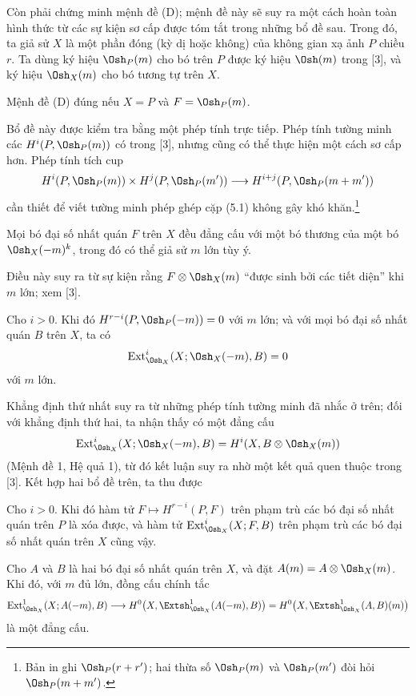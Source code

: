 Còn phải chứng minh mệnh đề (D); mệnh đề này sẽ suy ra một cách hoàn toàn hình
thức từ các sự kiện sơ cấp được tóm tắt trong những bổ đề sau. Trong đó, ta giả
sử $X$ là một phần đóng (kỳ dị hoặc không) của không gian xạ ảnh $P$ chiều
$r$. Ta dùng ký hiệu $\Osh_P(m)$ cho bó trên $P$ được ký hiệu $\Osh(m)$ trong
[3], và ký hiệu $\Osh_X(m)$ cho bó tương tự trên $X$.

 Mệnh đề (D) đúng nếu $X=P$ và $F=\Osh_P(m)$.

Bổ đề này được kiểm tra bằng một phép tính trực tiếp. Phép tính tường minh các
$H^{i}(P,\Osh_P(m))$ có trong [3], nhưng cũng có thể thực hiện một cách sơ cấp
hơn. Phép tính tích cup
\[
  H^{i}(P,\Osh_P(m))\times H^{j}(P,\Osh_P(m'))
  \longrightarrow H^{i+j}(P,\Osh_P(m+m'))
\]
cần thiết để viết tường minh phép ghép cặp (5.1) không gây khó
khăn.\footnote{Bản in ghi $\Osh_P(r+r')$; hai thừa số
$\Osh_P(m)$ và $\Osh_P(m')$ đòi hỏi $\Osh_P(m+m')$.}

 Mọi bó đại số nhất quán $F$ trên $X$ đều đẳng cấu với một
bó thương của một bó $\Osh_X(-m)^{k}$, trong đó có thể giả sử $m$ lớn tùy ý.

Điều này suy ra từ sự kiện rằng $F\otimes\Osh_X(m)$ ``được sinh bởi các tiết
diện'' khi $m$ lớn; xem [3].

 Cho $i>0$. Khi đó
$H^{r-i}(P,\Osh_P(-m))=0$ với $m$ lớn; và với mọi bó đại số nhất quán $B$
trên $X$, ta có
\[
  \operatorname{Ext}_{\Osh_X}^{i}(X;\Osh_X(-m),B)=0
\]
với $m$ lớn.

Khẳng định thứ nhất suy ra từ những phép tính tường minh đã nhắc ở trên; đối
với khẳng định thứ hai, ta nhận thấy có một đẳng cấu
\[
  \operatorname{Ext}_{\Osh_X}^{i}(X;\Osh_X(-m),B)
  =H^{i}(X,B\otimes\Osh_X(m))
\]
(Mệnh đề 1, Hệ quả 1), từ đó kết luận suy ra nhờ một kết quả quen thuộc trong
[3]. Kết hợp hai bổ đề trên, ta thu được

 Cho $i>0$. Khi đó hàm tử
$F\longmapsto H^{r-i}(P,F)$ trên phạm trù các bó đại số nhất quán trên $P$
là xóa được, và hàm tử
$\operatorname{Ext}_{\Osh_X}^{i}(X;F,B)$ trên phạm trù các bó đại số nhất quán
trên $X$ cũng vậy.

 Cho $A$ và $B$ là hai bó đại số nhất quán trên
$X$, và đặt $A(m)=A\otimes\Osh_X(m)$. Khi đó, với $m$ đủ lớn,
đồng cấu chính tắc
\[
  \operatorname{Ext}_{\Osh_X}^{1}(X;A(-m),B)
  \longrightarrow H^{0}\bigl(X,\Extsh_{\Osh_X}^{1}(A(-m),B)\bigr)
  =H^{0}\bigl(X,\Extsh_{\Osh_X}^{1}(A,B)(m)\bigr)
\]
là một đẳng cấu.


